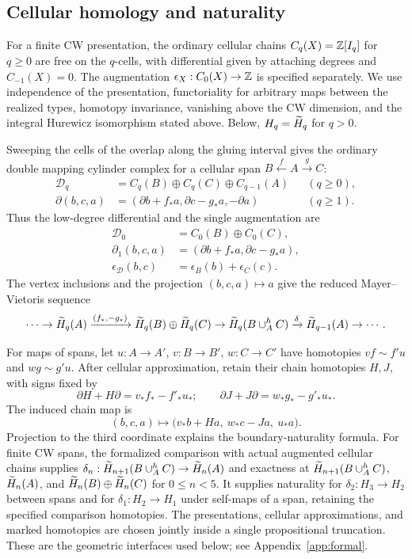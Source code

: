 \subsection{Cellular homology and naturality}

For a finite CW presentation, the ordinary cellular chains $C_q(X)=\mathbb Z[I_q]$ for $q\geq0$ are free on the $q$-cells, with differential given by attaching degrees and $C_{-1}(X)=0$. The augmentation $\epsilon_X:C_0(X)\to\mathbb Z$ is specified separately. We use independence of the presentation, functoriality for arbitrary maps between the realized types, homotopy invariance, vanishing above the CW dimension, and the integral Hurewicz isomorphism stated above. Below, $H_q=\widetilde H_q$ for $q>0$.

Sweeping the cells of the overlap along the gluing interval gives the ordinary double mapping cylinder complex for a cellular span $B\xleftarrow f A\xrightarrow g C$:
\begin{equation}\label{eq:DMC}
\begin{aligned}
\mathcal D_q&=C_q(B)\oplus C_q(C)\oplus C_{q-1}(A) &&(q\geq0),\\
\partial(b,c,a)&=(\partial b+f_*a,\partial c-g_*a,-\partial a) &&(q\geq1).
\end{aligned}
\end{equation}
Thus the low-degree differential and the single augmentation are
\[
\begin{aligned}
\mathcal D_0&=C_0(B)\oplus C_0(C),\\
\partial_1(b,c,a)&=(\partial b+f_*a,\partial c-g_*a),\\
\epsilon_{\mathcal D}(b,c)&=\epsilon_B(b)+\epsilon_C(c).
\end{aligned}
\]
The vertex inclusions and the projection $(b,c,a)\mapsto a$ give the reduced Mayer--Vietoris sequence
\begin{equation}\label{eq:MV}
\cdots\to\widetilde H_q(A)\xrightarrow{(f_*,-g_*)}
\widetilde H_q(B)\oplus\widetilde H_q(C)\to\widetilde H_q(B\mathbin{\cup}^{h}_A C)
\xrightarrow{\delta}\widetilde H_{q-1}(A)\to\cdots.
\end{equation}

For maps of spans, let $u:A\to A'$, $v:B\to B'$, $w:C\to C'$ have homotopies $vf\sim f'u$ and $wg\sim g'u$. After cellular approximation, retain their chain homotopies $H,J$, with signs fixed by
\[
\partial H+H\partial=v_*f_*-f'_*u_*;
\qquad
\partial J+J\partial=w_*g_*-g'_*u_*.
\]
The induced chain map is
\[
(b,c,a)\longmapsto
\bigl(v_*b+Ha,\ w_*c-Ja,\ u_*a\bigr).
\]
Projection to the third coordinate explains the boundary-naturality formula. For finite CW spans, the formalized comparison with actual augmented cellular chains supplies $\delta_n:\widetilde H_{n+1}(B\mathbin{\cup}^{h}_A C)\to\widetilde H_n(A)$ and exactness at $\widetilde H_{n+1}(B\mathbin{\cup}^{h}_A C)$, $\widetilde H_n(A)$, and $\widetilde H_n(B)\oplus\widetilde H_n(C)$ for $0\leq n<5$. It supplies naturality for $\delta_2:H_3\to H_2$ between spans and for $\delta_1:H_2\to H_1$ under self-maps of a span, retaining the specified comparison homotopies. The presentations, cellular approximations, and marked homotopies are chosen jointly inside a single propositional truncation. These are the geometric interfaces used below; see Appendix~\ref{app:formal}.

